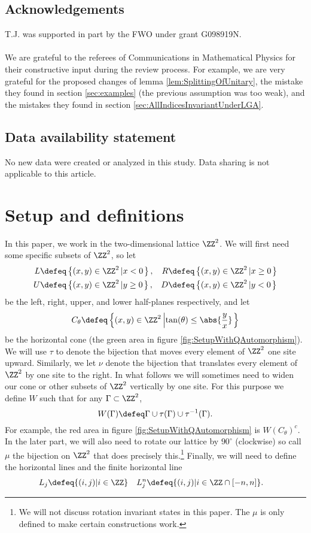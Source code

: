 \subsection*{Acknowledgements}
T.J. was supported in part by the FWO under grant G098919N.\\\\
We are grateful to the referees of Communications in Mathematical Physics for their constructive input during the review process. For example, we are very grateful for the proposed changes of lemma \ref{lem:SplittingOfUnitary}, the mistake they found in section \ref{sec:examples} (the previous assumption was too weak), and the mistakes they found in section \ref{sec:AllIndicesInvariantUnderLGA}.
\subsection*{Data availability statement}
No new data were created or analyzed in this study. Data sharing is not applicable to this article.
\section{Setup and definitions}\label{sec:Setup}
In this paper, we work in the two-dimensional lattice $\ZZ^2$. We will first need some specific subsets of $\ZZ^2$, so let
\begin{align}
	L&\defeq \left\{(x,y)\in\ZZ^2\left|x<0\right.\right\},&R&\defeq \left\{(x,y)\in\ZZ^2\left|x\geq 0\right.\right\}\\
	U&\defeq \left\{(x,y)\in\ZZ^2\left|y\geq 0\right.\right\},&D&\defeq \left\{(x,y)\in\ZZ^2\left|y<0\right.\right\}
\end{align}
be the left, right, upper, and lower half-planes respectively, and let
\begin{equation}
	C_\theta\defeq \left\{(x,y)\in\ZZ^2\left|\tan(\theta)\leq\abs{\frac{y}{x}}\right.\right\}
\end{equation}
be the horizontal cone (the green area in figure \ref{fig:SetupWithQAutomorphism}). We will use $\tau$ to denote the bijection that moves every element of $\ZZ^2$ one site upward. Similarly, we let $\nu$ denote the bijection that translates every element of $\ZZ^2$ by one site to the right. In what follows we will sometimes need to widen our cone or other subsets of $\ZZ^2$ vertically by one site. For this purpose we define $W$ such that for any $\Gamma\subset\ZZ^2$,
\begin{equation}
	W(\Gamma)\defeq \Gamma\cup\tau(\Gamma)\cup\tau^{-1}(\Gamma).
\end{equation}
For example, the red area in figure \ref{fig:SetupWithQAutomorphism} is $W(C_\theta)^c$. In the later part, we will also need to rotate our lattice by $90^\circ$ (clockwise) so call $\mu$ the bijection on $\ZZ^2$ that does precisely this.\footnote{We will not discuss rotation invariant states in this paper. The $\mu$ is only defined to make certain constructions work.} Finally, we will need to define the horizontal lines and the finite horizontal line
\begin{align}
	L_j&\defeq \{(i,j)|i\in\ZZ\}&L_j^n&\defeq \{(i,j)|i\in\ZZ\cap[-n,n]\}.
\end{align}
